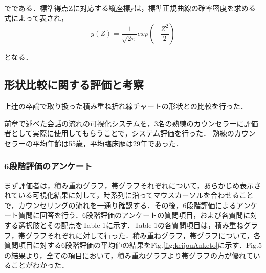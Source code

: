 \documentclass[shuuron]{kuee}
\begin{document}
でである．標準得点Zに対応する縦座標yは，標準正規曲線の確率密度を求める式によって表され，
\begin{equation}
y(Z)=\frac{1}{\sqrt{2\pi}}exp(-\frac{Z^2}{2})
\end{equation}

となる．






\subsection{形状比較に関する評価と考察}
上辻\cite{uetsuji}の卒論で取り扱った積み重ね折れ線チャートの形状との比較を行った．

前章で述べた会話の流れの可視化システムを，3名の熟練のカウンセラーに評価者として実際に使用してもらうことで，システム評価を行った．
熟練のカウンセラーの平均年齢は55歳，平均臨床歴は29年であった．

\subsubsection{6段階評価のアンケート}



まず評価者は，積み重ねグラフ，帯グラフそれぞれについて，あらかじめ表示されている可視化結果に対して，時系列に沿ってマウスカーソルを合わせることで，カウンセリングの流れを一通り確認する．その後，6段階評価によるアンケート質問に回答を行う．6段階評価のアンケートの質問項目，および各質問に対する選択肢とその配点をTable 1に示す．Table 1の各質問項目は，積み重ねグラフ，帯グラフそれぞれに対して行った．積み重ねグラフ，帯グラフについて，各質問項目に対する6段階評価の平均値の結果をFig.\ref{fig:keijouAnketo}に示す．Fig.5 の結果より，全ての項目において，積み重ねグラフより帯グラフの方が優れていることがわかった．

%
\end{document}
